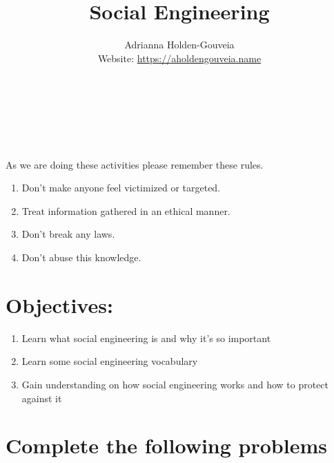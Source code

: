 \documentclass[12pt]{article}
\title{Social Engineering}
\author{
        Adrianna Holden-Gouveia \\
        Website: \url{https://aholdengouveia.name}\\ 
        \date{\vspace{-5ex}}
        \faLinkedin{: aholdengouveia} \\
        \faGithub {: aholdengouveia} \\
        \faTwitter {: aholdengouveia} \\
        }
\begin{document}
    

\maketitle


As we are doing these activities please remember these rules.
\begin{enumerate}
    \item Don't make anyone feel victimized or targeted.
    \item Treat information gathered in an ethical manner. 
    \item Don't break any laws. 
    \item Don't abuse this knowledge. 
\end{enumerate}

    
    


\section*{Objectives:}
\begin{enumerate}
    \item Learn what social engineering is and why it's so important
    \item Learn some social engineering vocabulary
    \item Gain understanding on how social engineering works and how to protect against it
\end{enumerate}
\section*{Complete the following problems}

\end{document}

